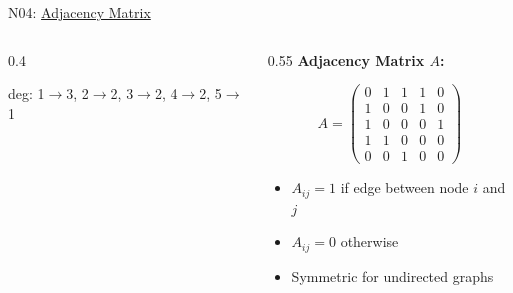 \documentclass[aspectratio=169, 10pt]{beamer}
\begin{document}
\begin{frame}{N04: \href{https://en.wikipedia.org/wiki/Adjacency_matrix}{Adjacency Matrix}}
    
    \begin{columns}
        \begin{column}{0.4\textwidth}
            \begin{center}
            \end{center}
            \scriptsize
            deg: 1$\rightarrow$3, 2$\rightarrow$2, 3$\rightarrow$2, 4$\rightarrow$2, 5$\rightarrow$1
        \end{column}
        
        \begin{column}{0.55\textwidth}
            \textbf{Adjacency Matrix $A$:}
            
            \[
            A = \begin{pmatrix}
            0 & 1 & 1 & 1 & 0 \\
            1 & 0 & 0 & 1 & 0 \\
            1 & 0 & 0 & 0 & 1 \\
            1 & 1 & 0 & 0 & 0 \\
            0 & 0 & 1 & 0 & 0
            \end{pmatrix}
            \]
            
            \begin{itemize}
                \item $A_{ij} = 1$ if edge between node $i$ and $j$
                \item $A_{ij} = 0$ otherwise
                \item Symmetric for undirected graphs
            \end{itemize}
        \end{column}
    \end{columns}
    

\end{frame}
\end{document}
